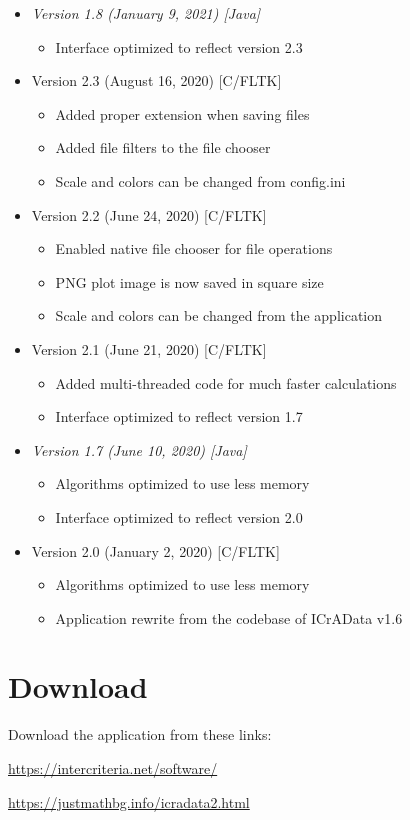 \documentclass[11pt, a4paper]{article}
\begin{document}
\begin{itemize}
\item {\it Version 1.8 (January 9, 2021) [Java]}
\begin{itemize}\it
\item Interface optimized to reflect version 2.3
\end{itemize}

\item Version 2.3 (August 16, 2020) [C/FLTK]
\begin{itemize}
\item Added proper extension when saving files
\item Added file filters to the file chooser
\item Scale and colors can be changed from config.ini
\end{itemize}

\item Version 2.2 (June 24, 2020) [C/FLTK]
\begin{itemize}
\item Enabled native file chooser for file operations
\item PNG plot image is now saved in square size
\item Scale and colors can be changed from the application
\end{itemize}

\newpage
\item Version 2.1 (June 21, 2020) [C/FLTK]
\begin{itemize}
\item Added multi-threaded code for much faster calculations
\item Interface optimized to reflect version 1.7
\end{itemize}

\item {\it Version 1.7 (June 10, 2020) [Java]}
\begin{itemize}\it
\item Algorithms optimized to use less memory
\item Interface optimized to reflect version 2.0
\end{itemize}

\item Version 2.0 (January 2, 2020) [C/FLTK]
\begin{itemize}
\item Algorithms optimized to use less memory
\item Application rewrite from the codebase of ICrAData v1.6
\end{itemize}
\end{itemize}


\section{Download}

Download the application from these links:

\url{https://intercriteria.net/software/}

\url{https://justmathbg.info/icradata2.html}
\end{document}
